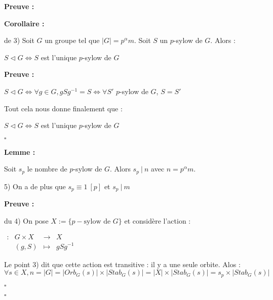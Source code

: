 \documentclass{report}
\renewenvironment{leftbar}{%
  \def\FrameCommand{\vrule width 0.4pt \hspace{10pt}}%
  \MakeFramed {\advance\hsize-\width \FrameRestore}}%
 {\endMakeFramed}%
\newenvironment{preuve}{\vspace*{0.5cm}
    \begin{leftbar}
    \noindent\textbf{Preuve :}\par}{
    \begin{flushright}
    $\square$
    \end{flushright}
    \end{leftbar}
}
\newenvironment{corollaire}{\begin{tcolorbox}[colframe= white]
    \textbf{Corollaire :} \par}
    {\end{tcolorbox}}
\newenvironment{lemme}[2][white]{\begin{tcolorbox}[colframe= #1]
    \textbf{Lemme :} #2  \par}
    {\end{tcolorbox}}
\newcommand{\fonction}[5]{
    \begin{array}{l|rcl}
    #1: & #2 & \longrightarrow & #3 \\
        & #4 & \longmapsto & #5 
    \end{array}
}
\begin{document}
\begin{preuve}
        \begin{corollaire}{de 3)}
            Soit $G$ un groupe tel que $|G| = p^\alpha m$. Soit $S$ un $p$-sylow de $G$. Alors  :
            \begin{center}
                $S\triangleleft G \Longleftrightarrow S $ est l'unique $p$-sylow de $G$
            \end{center}
        \end{corollaire}
        
        
        \begin{preuve}
            \begin{center}
                $S\triangleleft G \Longleftrightarrow \forall g\in G , gSg^{-1}=S \Longleftrightarrow \forall S' $ $p$-sylow de $G$, $S = S'$
            \end{center}
        
            Tout cela nous  donne finalement que : 
        
            \begin{center}
                $S \triangleleft G \Longleftrightarrow S $ est l'unique $p$-sylow de $G$
            \end{center}
        \end{preuve}
        
        \bigbreak
        
        \begin{lemme}{}
            Soit $s_p$ le nombre de $p$-sylow de $G$. Alors $s_p ~|~n$ avec $n=p^\alpha m$.
        \end{lemme}
        
        \bigbreak
        
        5) On a de plus que $s_p \equiv 1 ~[p]$ et $s_p~|~m$ 
    
        \begin{preuve}{du 4)}
            On pose $X:=\{p-\text{sylow de } G\}$ et considère l'action : 
         
            \begin{center}
                $\fonction{}{G \times X}{X}{(g,S)}{gSg^{-1}}$
            \end{center}
        
            Le point 3) dit que cette action est transitive : il y a une seule orbite. Alos : $\forall s \in X, n=|G|=|Orb_G(s)|\times |Stab_G(s)| = |X|\times |Stab_G(s)|=s_p\times|Stab_G(s)|$
         
            \newline
         

\end{preuve}
\end{preuve}
\end{document}

